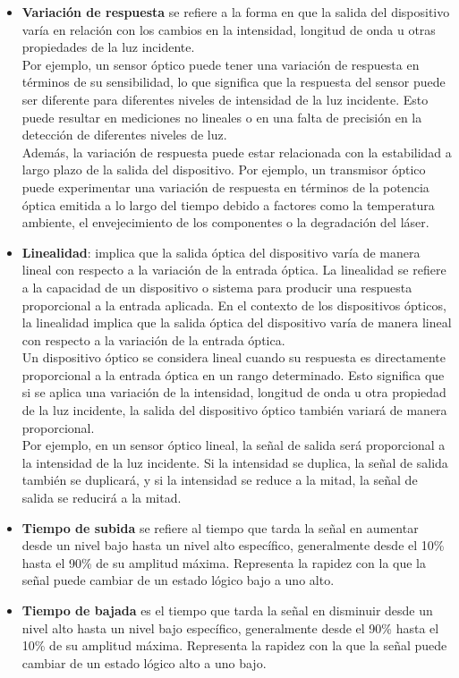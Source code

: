 \documentclass[12pt,fleqn,a4paper,oneside]{LegrandOrangeBook}
\begin{document}
\begin{itemize}
\item \textbf{Variación de respuesta} se refiere a la forma en que la salida del dispositivo varía en relación con los cambios en la intensidad, longitud de onda u otras propiedades de la luz incidente.\\
Por ejemplo, un sensor óptico puede tener una variación de respuesta en términos de su sensibilidad, lo que significa que la respuesta del sensor puede ser diferente para diferentes niveles de intensidad de la luz incidente. Esto puede resultar en mediciones no lineales o en una falta de precisión en la detección de diferentes niveles de luz.\\
Además, la variación de respuesta puede estar relacionada con la estabilidad a largo plazo de la salida del dispositivo. Por ejemplo, un transmisor óptico puede experimentar una variación de respuesta en términos de la potencia óptica emitida a lo largo del tiempo debido a factores como la temperatura ambiente, el envejecimiento de los componentes o la degradación del láser.

\item \textbf{Linealidad}: implica que la salida óptica del dispositivo varía de manera lineal con respecto a la variación de la entrada óptica. 
La linealidad se refiere a la capacidad de un dispositivo o sistema para producir una respuesta proporcional a la entrada aplicada. En el contexto de los dispositivos ópticos, la linealidad implica que la salida óptica del dispositivo varía de manera lineal con respecto a la variación de la entrada óptica.\\
Un dispositivo óptico se considera lineal cuando su respuesta es directamente proporcional a la entrada óptica en un rango determinado. Esto significa que si se aplica una variación de la intensidad, longitud de onda u otra propiedad de la luz incidente, la salida del dispositivo óptico también variará de manera proporcional.\\
Por ejemplo, en un sensor óptico lineal, la señal de salida será proporcional a la intensidad de la luz incidente. Si la intensidad se duplica, la señal de salida también se duplicará, y si la intensidad se reduce a la mitad, la señal de salida se reducirá a la mitad.

\item \textbf{Tiempo de subida} se refiere al tiempo que tarda la señal en aumentar desde un nivel bajo hasta un nivel alto específico, generalmente desde el 10\% hasta el 90\% de su amplitud máxima. Representa la rapidez con la que la señal puede cambiar de un estado lógico bajo a uno alto.

\item \textbf{Tiempo de bajada} es el tiempo que tarda la señal en disminuir desde un nivel alto hasta un nivel bajo específico, generalmente desde el 90\% hasta el 10\% de su amplitud máxima. Representa la rapidez con la que la señal puede cambiar de un estado lógico alto a uno bajo.
\end{itemize}
\end{document}
